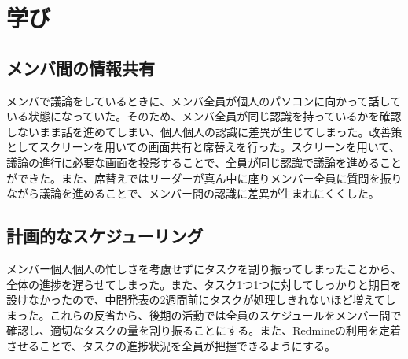 \chapter{学び}

\section{メンバ間の情報共有}
メンバで議論をしているときに、メンバ全員が個人のパソコンに向かって話している状態になっていた。そのため、メンバ全員が同じ認識を持っているかを確認しないまま話を進めてしまい、個人個人の認識に差異が生じてしまった。改善策としてスクリーンを用いての画面共有と席替えを行った。スクリーンを用いて、議論の進行に必要な画面を投影することで、全員が同じ認識で議論を進めることができた。また、席替えではリーダーが真ん中に座りメンバー全員に質問を振りながら議論を進めることで、メンバー間の認識に差異が生まれにくくした。
\section{計画的なスケジューリング}
メンバー個人個人の忙しさを考慮せずにタスクを割り振ってしまったことから、全体の進捗を遅らせてしまった。また、タスク1つ1つに対してしっかりと期日を設けなかったので、中間発表の2週間前にタスクが処理しきれないほど増えてしまった。これらの反省から、後期の活動では全員のスケジュールをメンバー間で確認し、適切なタスクの量を割り振ることにする。また、Redmineの利用を定着させることで、タスクの進捗状況を全員が把握できるようにする。
